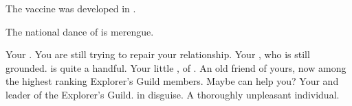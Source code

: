 \documentclass[char]{NeptuneBall}
\begin{document}
\begin{itemz}[Trivia]
  \item The \ppolio{} vaccine was developed in \pCity{}.
  \item The national dance of \pAtlantis{} is merengue.
\end{itemz}

\begin{contacts}
  \contact{\cKing{}} Your \cKing{\parent}. You are still trying to repair your relationship.
  \contact{\cWillow{}} Your \cWillow{\offspring}, who is still grounded. \cWillow{\They} is quite a handful.
  \contact{\cPrincess{}} Your little \cPrincess{\sibling}, \cPrincess{\prince} of \pAtlantis{}.
  \contact{\cPriest{}} An old friend of yours, now among the highest ranking Explorer's Guild members. Maybe \cPriest{\they} can help you?
  \contact{\cPlant{}} Your \cPlant{\uncle} and leader of the Explorer's Guild.
	\contact{\cWitch{\MYname}} \cWitch{} in disguise. A thoroughly unpleasant individual.
\end{contacts}
\end{document}
